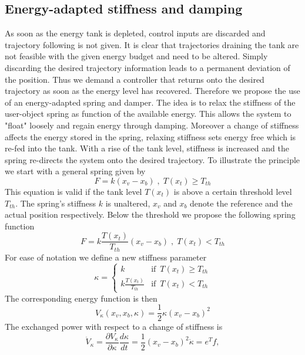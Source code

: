 \documentclass[a4paper,twoside, openright,12pt]{report}
\begin{document}
\subsection{Energy-adapted stiffness and damping}
As soon as the energy tank is depleted, control inputs are discarded and trajectory following is not given. It is clear that trajectories draining the tank are not feasible with the given energy budget and need to be altered. Simply discarding the desired trajectory information leads to a permanent deviation of the position. Thus we demand a controller that returns onto the desired trajectory as soon as the energy level has recovered. Therefore we propose the use of an energy-adapted spring and damper. The idea is to relax the stiffness of the user-object spring as function of the available energy. This allows the system to "float" loosely and regain energy through damping. Moreover a change of stiffness affects the energy stored in the spring, relaxing stiffness sets energy free which is re-fed into the tank. With a rise of the tank level, stiffness is increased and the spring re-directs the system onto the desired trajectory. To illustrate the principle we start with a general spring given by
\begin{equation}
F = k(x_v-x_b) \;,\; T(x_t)\geq T_{th}
\end{equation}
This equation is valid if the tank level $T(x_t)$ is above a certain threshold level $T_{th}$. The spring's stiffness $k$ is unaltered, $x_v$ and $x_b$ denote the reference and the actual position respectively. Below the threshold we propose the following spring function
\begin{equation}
F = k\frac{T(x_t)}{T_{th}}(x_v-x_b) \;,\; T(x_t)<T_{th}
\end{equation}
For ease of notation we define a new stiffness parameter
\begin{equation}
\kappa = \begin{cases}
k & \text{if } \, T(x_t)\geq T_{th} \\
k \frac{T(x_t)}{T_{th}} & \text{if } \, T(x_t) < T_{th}
\end{cases}
\end{equation}
The corresponding energy function is then
\begin{equation}
V_{\kappa}(x_v,x_b,\kappa) = \frac{1}{2} \kappa (x_v-x_b)^2
\end{equation}    
The exchanged power with respect to a change of stiffness is 
\begin{equation}
\dot{V}_{\kappa} =\frac{\partial V_{\kappa}}{\partial \kappa} \frac{d \kappa}{dt} = \frac{1}{2} (x_v-x_b)^2 \dot{\kappa} = e^Tf,
\end{equation}
\end{document}
